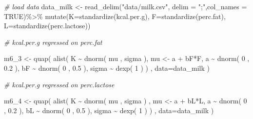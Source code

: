 \documentclass[
]{book}
\newenvironment{Shaded}{\begin{snugshade}}{\end{snugshade}}
\newcommand{\AttributeTok}[1]{\textcolor[rgb]{0.77,0.63,0.00}{#1}}
\newcommand{\CommentTok}[1]{\textcolor[rgb]{0.56,0.35,0.01}{\textit{#1}}}
\newcommand{\ConstantTok}[1]{\textcolor[rgb]{0.00,0.00,0.00}{#1}}
\newcommand{\DecValTok}[1]{\textcolor[rgb]{0.00,0.00,0.81}{#1}}
\newcommand{\FloatTok}[1]{\textcolor[rgb]{0.00,0.00,0.81}{#1}}
\newcommand{\FunctionTok}[1]{\textcolor[rgb]{0.00,0.00,0.00}{#1}}
\newcommand{\NormalTok}[1]{#1}
\newcommand{\OtherTok}[1]{\textcolor[rgb]{0.56,0.35,0.01}{#1}}
\newcommand{\SpecialCharTok}[1]{\textcolor[rgb]{0.00,0.00,0.00}{#1}}
\newcommand{\StringTok}[1]{\textcolor[rgb]{0.31,0.60,0.02}{#1}}
\begin{document}
\begin{Shaded}
\begin{Highlighting}[]
\CommentTok{\# load data}
\NormalTok{data\_milk }\OtherTok{\textless{}{-}} \FunctionTok{read\_delim}\NormalTok{(}\StringTok{"data/milk.csv"}\NormalTok{, }\AttributeTok{delim =} \StringTok{";"}\NormalTok{,}\AttributeTok{col\_names =} \ConstantTok{TRUE}\NormalTok{)}\SpecialCharTok{\%\textgreater{}\%}
  \FunctionTok{mutate}\NormalTok{(}\AttributeTok{K=}\FunctionTok{standardize}\NormalTok{(kcal.per.g),}
         \AttributeTok{F=}\FunctionTok{standardize}\NormalTok{(perc.fat),}
         \AttributeTok{L=}\FunctionTok{standardize}\NormalTok{(perc.lactose))}

\CommentTok{\# kcal.per.g regressed on perc.fat }

\NormalTok{m6\_3 }\OtherTok{\textless{}{-}} \FunctionTok{quap}\NormalTok{(}
  \FunctionTok{alist}\NormalTok{(}
\NormalTok{    K }\SpecialCharTok{\textasciitilde{}} \FunctionTok{dnorm}\NormalTok{( mu , sigma ), }
\NormalTok{    mu }\OtherTok{\textless{}{-}}\NormalTok{ a }\SpecialCharTok{+}\NormalTok{ bF}\SpecialCharTok{*}\NormalTok{F, }
\NormalTok{    a }\SpecialCharTok{\textasciitilde{}} \FunctionTok{dnorm}\NormalTok{( }\DecValTok{0}\NormalTok{ , }\FloatTok{0.2}\NormalTok{ ), }
\NormalTok{    bF }\SpecialCharTok{\textasciitilde{}} \FunctionTok{dnorm}\NormalTok{( }\DecValTok{0}\NormalTok{ , }\FloatTok{0.5}\NormalTok{ ), }
\NormalTok{    sigma }\SpecialCharTok{\textasciitilde{}} \FunctionTok{dexp}\NormalTok{( }\DecValTok{1}\NormalTok{ )}
\NormalTok{) , }\AttributeTok{data=}\NormalTok{data\_milk )}

\CommentTok{\# kcal.per.g regressed on perc.lactose }


\NormalTok{m6\_4 }\OtherTok{\textless{}{-}} \FunctionTok{quap}\NormalTok{( }
  \FunctionTok{alist}\NormalTok{(}
\NormalTok{    K }\SpecialCharTok{\textasciitilde{}} \FunctionTok{dnorm}\NormalTok{( mu , sigma )}
\NormalTok{    , mu }\OtherTok{\textless{}{-}}\NormalTok{ a }\SpecialCharTok{+}\NormalTok{ bL}\SpecialCharTok{*}\NormalTok{L, }
\NormalTok{    a }\SpecialCharTok{\textasciitilde{}} \FunctionTok{dnorm}\NormalTok{( }\DecValTok{0}\NormalTok{ , }\FloatTok{0.2}\NormalTok{ ), }
\NormalTok{    bL }\SpecialCharTok{\textasciitilde{}} \FunctionTok{dnorm}\NormalTok{( }\DecValTok{0}\NormalTok{ , }\FloatTok{0.5}\NormalTok{ ), }
\NormalTok{    sigma }\SpecialCharTok{\textasciitilde{}} \FunctionTok{dexp}\NormalTok{( }\DecValTok{1}\NormalTok{ )}
\NormalTok{) , }\AttributeTok{data=}\NormalTok{data\_milk )}



\end{Highlighting}
\end{Shaded}
\end{document}
